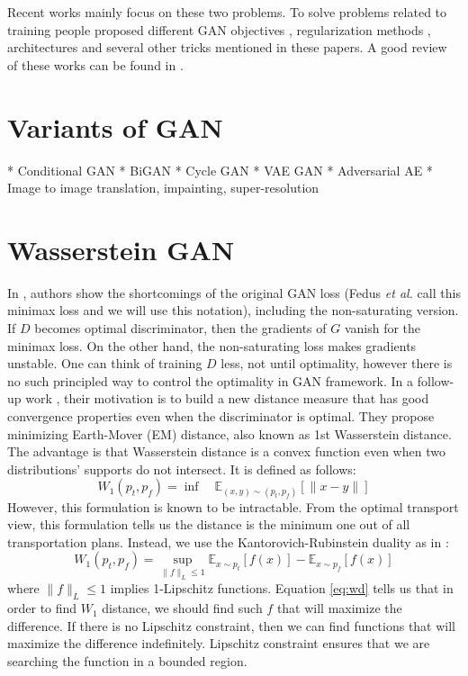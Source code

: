 \documentclass[a4paper,onesided,12pt]{report}
\begin{document}
Recent works mainly focus on these two problems. To solve problems related to training people proposed different GAN objectives \cite{arjovsky2017wasserstein,chen2016infogan,mao2017least,qi2017loss}, regularization methods \cite{gulrajani2017improved,miyato2018spectral,radford2015unsupervised}, architectures \cite{brock2018large,donahue2016adversarial,dumoulin2016adversarially,karras2017progressive,karras2019style,radford2015unsupervised,zhang2018self} and several other tricks mentioned in these papers. A good review of these works can be found in \cite{creswell2018generative,hong2019generative,kurach2018gan}.

\section{Variants of GAN}
\label{sec:variants}
* Conditional GAN
* BiGAN
* Cycle GAN
* VAE GAN
* Adversarial AE
* Image to image translation, impainting, super-resolution


\section{Wasserstein GAN}
\label{sec:wgan}
In \cite{arjovsky2017towards}, authors show the shortcomings of the original GAN loss (Fedus \textit{et al.} \cite{fedus2017many} call this minimax loss and we will use this notation), including the non-saturating version. If $D$ becomes optimal discriminator, then the gradients of $G$ vanish for the minimax loss. On the other hand, the non-saturating loss makes gradients unstable. One can think of training $D$ less, not until optimality, however there is no such principled way to control the optimality in GAN framework. In a follow-up work \cite{arjovsky2017wasserstein}, their motivation is to build a new distance measure that has good convergence properties even when the discriminator is optimal. They propose minimizing Earth-Mover (EM) distance, also known as 1st Wasserstein distance. The advantage is that Wasserstein distance is a convex function even when two distributions' supports do not intersect. It is defined as follows:
\begin{equation}
W_1(p_t, p_f) = \inf \quad \mathbb{E}_{(x,y) \sim (p_t, p_f)} [ \| x-y \| ]
\label{eq:emd}
\end{equation}
However, this formulation is known to be intractable. From the optimal transport view, this formulation tells us the distance is the minimum one out of all transportation plans. Instead, we use the Kantorovich-Rubinstein duality as in \cite{arjovsky2017wasserstein}:
\begin{equation}
W_1(p_t, p_f) = \underset{\|f\|_L \leq 1}{\sup} \mathbb{E}_{x\sim p_t} [f(x)] - \mathbb{E}_{x \sim p_f} [f(x)]
\label{eq:wd}
\end{equation}
where $\|f\|_L \leq 1$ implies 1-Lipschitz functions. Equation \ref{eq:wd} tells us that in order to find $W_1$ distance, we should find such $f$ that will maximize the difference. If there is no Lipschitz constraint, then we can find functions that will maximize the difference indefinitely. Lipschitz constraint ensures that we are searching the function in a bounded region.
\end{document}
